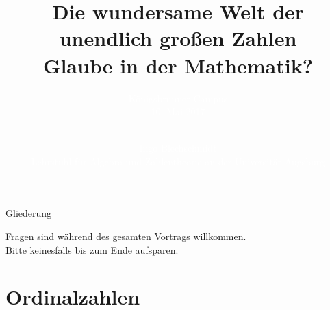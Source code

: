 \documentclass[12pt,compress,ngerman,utf8,t]{beamer}
\title[Unendlich große Zahlen]{\bf Die wundersame Welt der \\ unendlich großen Zahlen
\\[0.5em] \normalsize Glaube in der Mathematik?}
\author[Ingo Blechschmidt]{\textcolor{white}{Königsbrunner Campus \\ 10. Mai 2017}}
\date[2017-05-10]{\vspace*{6em}\ \\\textcolor{white}{Ingo Blechschmidt \\ \scriptsize
Lehrstuhl für Algebra und Zahlentheorie an der Universität Augsburg \\}}
\begin{document}
{
\frame{\vspace*{-1em}\titlepage}}

\begin{frame}{Gliederung}
  \tableofcontents

  \centering
  Fragen sind während des gesamten Vortrags willkommen. \\
  Bitte keinesfalls bis zum Ende aufsparen.
  \par
\end{frame}

\section{Ordinalzahlen}
\end{document}

